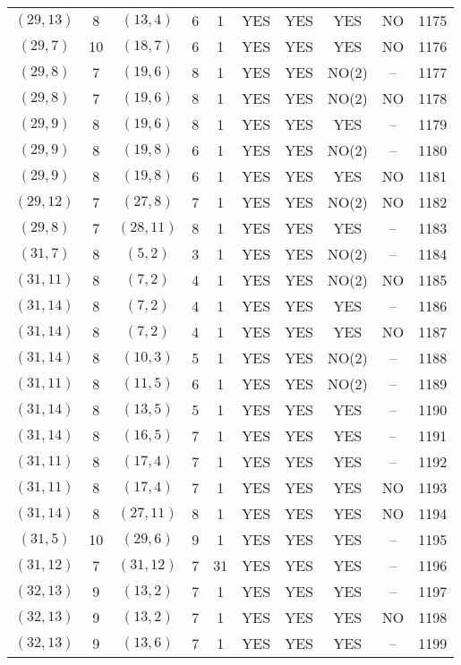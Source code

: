 \begin{longtable}{|c|c|c|c|c|c|c|c|c|c|}
$(29, 13)$ & 8 & $(13, 4)$ & 6 & 1 & YES & YES & YES & NO & 1175\\
$(29, 7)$ & 10 & $(18, 7)$ & 6 & 1 & YES & YES & YES & NO & 1176\\
$(29, 8)$ & 7 & $(19, 6)$ & 8 & 1 & YES & YES & NO(2) & -- & 1177\\
$(29, 8)$ & 7 & $(19, 6)$ & 8 & 1 & YES & YES & NO(2) & NO & 1178\\
$(29, 9)$ & 8 & $(19, 6)$ & 8 & 1 & YES & YES & YES & -- & 1179\\
$(29, 9)$ & 8 & $(19, 8)$ & 6 & 1 & YES & YES & NO(2) & -- & 1180\\
$(29, 9)$ & 8 & $(19, 8)$ & 6 & 1 & YES & YES & YES & NO & 1181\\
$(29, 12)$ & 7 & $(27, 8)$ & 7 & 1 & YES & YES & NO(2) & NO & 1182\\
$(29, 8)$ & 7 & $(28, 11)$ & 8 & 1 & YES & YES & YES & -- & 1183\\
$(31, 7)$ & 8 & $(5, 2)$ & 3 & 1 & YES & YES & NO(2) & -- & 1184\\
$(31, 11)$ & 8 & $(7, 2)$ & 4 & 1 & YES & YES & NO(2) & NO & 1185\\
$(31, 14)$ & 8 & $(7, 2)$ & 4 & 1 & YES & YES & YES & -- & 1186\\
$(31, 14)$ & 8 & $(7, 2)$ & 4 & 1 & YES & YES & YES & NO & 1187\\
$(31, 14)$ & 8 & $(10, 3)$ & 5 & 1 & YES & YES & NO(2) & -- & 1188\\
$(31, 11)$ & 8 & $(11, 5)$ & 6 & 1 & YES & YES & NO(2) & -- & 1189\\
$(31, 14)$ & 8 & $(13, 5)$ & 5 & 1 & YES & YES & YES & -- & 1190\\
$(31, 14)$ & 8 & $(16, 5)$ & 7 & 1 & YES & YES & YES & -- & 1191\\
$(31, 11)$ & 8 & $(17, 4)$ & 7 & 1 & YES & YES & YES & -- & 1192\\
$(31, 11)$ & 8 & $(17, 4)$ & 7 & 1 & YES & YES & YES & NO & 1193\\
$(31, 14)$ & 8 & $(27, 11)$ & 8 & 1 & YES & YES & YES & NO & 1194\\
$(31, 5)$ & 10 & $(29, 6)$ & 9 & 1 & YES & YES & YES & -- & 1195\\
$(31, 12)$ & 7 & $(31, 12)$ & 7 & 31 & YES & YES & YES & -- & 1196\\
$(32, 13)$ & 9 & $(13, 2)$ & 7 & 1 & YES & YES & YES & -- & 1197\\
$(32, 13)$ & 9 & $(13, 2)$ & 7 & 1 & YES & YES & YES & NO & 1198\\
$(32, 13)$ & 9 & $(13, 6)$ & 7 & 1 & YES & YES & YES & -- & 1199\\

\end{longtable}

